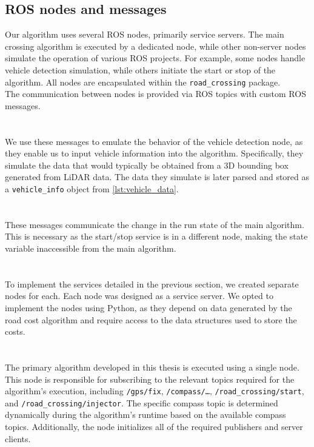     \subsection{ROS nodes and messages}
        Our algorithm uses several ROS nodes, primarily service servers. The main crossing algorithm is executed by a dedicated node, while other non-server nodes simulate the operation of various ROS projects. For example, some nodes handle vehicle detection simulation, while others initiate the start or stop of the algorithm. All nodes are encapsulated within the \texttt{road\_crossing} package.\\
        The communication between nodes is provided via ROS topics with custom ROS messages.\\\\
        \\
            We use these messages to emulate the behavior of the vehicle detection node, as they enable us to input vehicle information into the algorithm. Specifically, they simulate the data that would typically be obtained from a 3D bounding box generated from LiDAR data. The data they simulate is later parsed and stored as a \texttt{vehicle\_info} object from \ref{lst:vehicle_data}.\\\\
        \\
            These messages communicate the change in the run state of the main algorithm. This is necessary as the start/stop service is in a different node, making the state variable inaccessible from the main algorithm.\\\\
        \\
            To implement the services detailed in the previous section, we created separate nodes for each. Each node was designed as a service server. We opted to implement the nodes using Python, as they depend on data generated by the road cost algorithm and require access to the data structures used to store the costs.\\\\
        \\
            The primary algorithm developed in this thesis is executed using a single node. This node is responsible for subscribing to the relevant topics required for the algorithm's execution, including \texttt{/gps/fix}, \texttt{/compass/\ldots}, \texttt{/road\_crossing/start}, and \texttt{/road\_crossing/injector}. The specific compass topic is determined dynamically during the algorithm's runtime based on the available compass topics. Additionally, the node initializes all of the required publishers and server clients.\\
